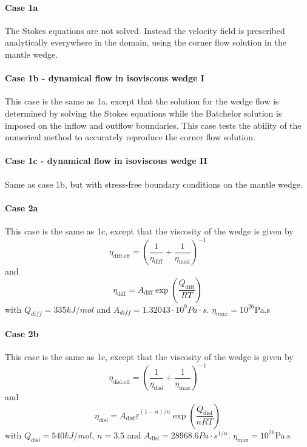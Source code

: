 \paragraph{Case 1a} The Stokes equations are not solved. Instead the velocity field
is prescribed analytically everywhere in the domain, using the corner flow solution 
in the mantle wedge. 

\paragraph{Case 1b - dynamical flow in isoviscous wedge I}
This case is the same as 1a, except that the solution
for the wedge flow is determined by solving the Stokes equations while the Batchelor solution is
imposed on the inflow and outflow boundaries. This case tests the ability of the numerical method
to accurately reproduce the corner flow solution.



\paragraph{Case 1c - dynamical flow in isoviscous wedge II} 
Same as case 1b, but with stress-free boundary conditions on the mantle wedge.



\paragraph{Case 2a}

This case is the same as 1c, except that the viscosity of the wedge
is given by 
\[
\eta_{\text{diff,eff}} = \left( \frac{1}{\eta_{\text{diff}}} + \frac{1}{\eta_{\text{max}}} \right)^{-1}
\]
and
\[
\eta_{\text{diff}}=A_{\text{diff}} \exp\left( \frac{Q_{\text{diff}}}{RT} \right)
\]
with
$Q_{diff}=335kJ/mol$ and $A_{diff}=1.32043 \cdot 10^9Pa\cdot s$. $\eta_{max}=10^{26}$Pa.s

\paragraph{Case 2b}

This case is the same as 1c, except that the viscosity of the wedge
is given by 
\[
\eta_{\text{disl,eff}} = \left( \frac{1}{\eta_{\text{disl}}} + \frac{1}{\eta_{\text{max}}} \right)^{-1}
\]
and
\[
\eta_{\text{disl}}=
A_{\text{disl}} \dot\varepsilon^{(1-n)/n} \exp \left( \frac{Q_{\text{disl}}}{nRT} \right)
\]
with $Q_{\text{disl}}=540kJ/mol$, $n=3.5$ and $A_{\text{disl}}=28968.6Pa\cdot s^{1/n}$. 
$\eta_{\text{max}}=10^{26}$Pa.s






